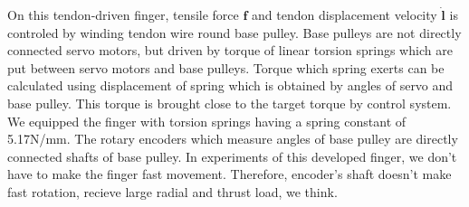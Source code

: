 \documentclass{llncs}
\begin{document}

On this tendon-driven finger, tensile force $\bm{f}$ and tendon displacement velocity $\dot{\bm{l}}$ is controled by winding tendon wire round base pulley.
Base pulleys are not directly connected servo motors, but driven by torque of linear torsion springs which are put between servo motors and base pulleys.
Torque which spring exerts can be calculated using displacement of spring which is obtained by angles of servo and base pulley.
This torque is brought close to the target torque by control system.
We equipped the finger with torsion springs having a spring constant of 5.17N/mm.
The rotary encoders which measure angles of base pulley are directly connected shafts of base pulley.
In experiments of this developed finger, we don't have to make the finger fast movement.
Therefore, encoder's shaft doesn't make fast rotation, recieve large radial and thrust load, we think. 
\end{document}
